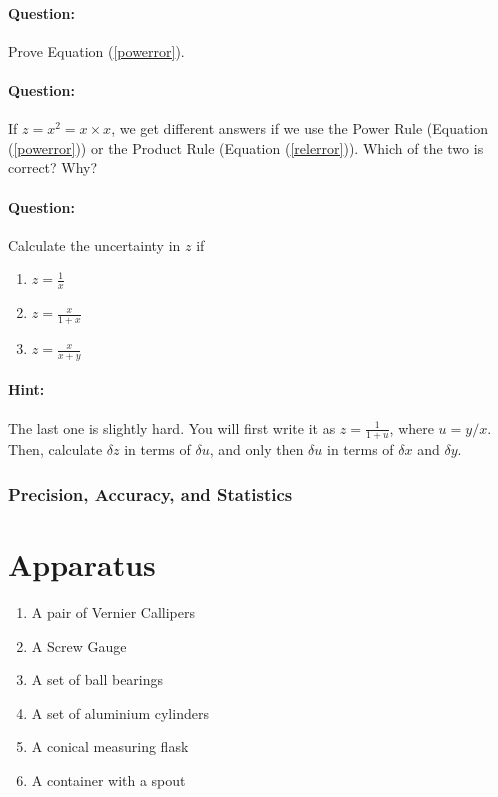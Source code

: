 \begin{question}
\paragraph{Question:} Prove Equation (\ref{powerror}).~\\

\paragraph{Question:} If $z = x^2 = x \times x$, we get different answers if we use the Power Rule (Equation (\ref{powerror})) or the Product Rule (Equation (\ref{relerror})). Which of the two is correct? Why? ~\\

\paragraph{Question:} Calculate the uncertainty in $z$ if
\begin{enumerate}
    \item $z = \frac{1}{x}$
    \item $z = \frac{x}{1+x}$
    \item $z = \frac{x}{x+y}$
\end{enumerate}
\paragraph{Hint:} The last one is slightly hard. You will first write it as $z = \frac{1}{1 + u}$, where $u = y/x$. Then, calculate $\delta z$ in terms of $\delta u$, and only then $\delta u$ in terms of $\delta x$ and $\delta y$.
\end{question}


\subsubsection{Precision, Accuracy, and Statistics}


\section{Apparatus}

\begin{enumerate}
    \item A pair of Vernier Callipers
    \item A Screw Gauge
    \item A set of ball bearings
    \item A set of aluminium cylinders
    \item A conical measuring flask
    \item A container with a spout
\end{enumerate}

